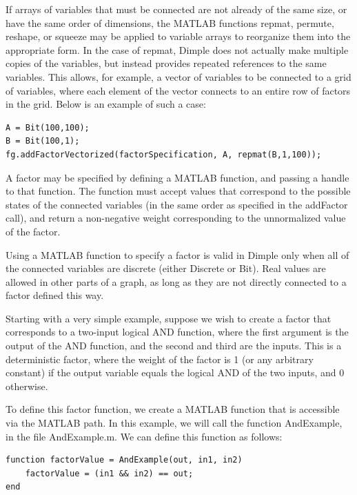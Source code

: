 If arrays of variables that must be connected are not already of the same size, or have the same order of dimensions, the MATLAB functions repmat, permute, reshape, or squeeze may be applied to variable arrays to reorganize them into the appropriate form.  In the case of repmat, Dimple does not actually make multiple copies of the variables, but instead provides repeated references to the same variables.  This allows, for example, a vector of variables to be connected to a grid of variables, where each element of the vector connects to an entire row of factors in the grid.  Below is an example of such a case:

\begin{lstlisting}
A = Bit(100,100);
B = Bit(100,1);
fg.addFactorVectorized(factorSpecification, A, repmat(B,1,100));
\end{lstlisting}




A factor may be specified by defining a MATLAB function, and passing a handle to that function.  The function must accept values that correspond to the possible states of the connected variables (in the same order as specified in the addFactor call), and return a non-negative weight corresponding to the unnormalized value of the factor.

Using a MATLAB function to specify a factor is valid in Dimple only when all of the connected variables are discrete (either Discrete or Bit).  Real values are allowed in other parts of a graph, as long as they are not directly connected to a factor defined this way.

Starting with a very simple example, suppose we wish to create a factor that corresponds to a two-input logical AND function, where the first argument is the output of the AND function, and the second and third are the inputs.  This is a deterministic factor, where the weight of the factor is 1 (or any arbitrary constant) if the output variable equals the logical AND of the two inputs, and 0 otherwise.

To define this factor function, we create a MATLAB function that is accessible via the MATLAB path.  In this example, we will call the function AndExample, in the file AndExample.m.  We can define this function as follows:

\begin{lstlisting}
function factorValue = AndExample(out, in1, in2)
    factorValue = (in1 && in2) == out;
end
\end{lstlisting}

